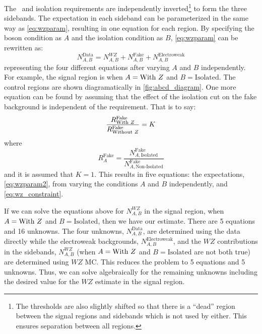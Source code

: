 The \z~and isolation requirements are 
independently inverted\footnote{The thresholds are also slightly shifted 
so that there is a ``dead'' region between the signal regions and sidebands 
which is not used by either. This ensures separation between all regions.}
to form the three sidebands.
The expectation in each sideband can be parameterized
in the same way as \eqn\eqref{eq:wzparam}, resulting in one
equation for each region. By specifying the \z boson condition
as $A$ and the isolation condition as $B$, \eqn\eqref{eq:wzparam}
can be rewritten as:
\begin{equation}
\label{eq:wzparam2}
N^{\textrm{Data}}_{A,B} =  N^{WZ}_{A,B} + N^{\textrm{Fake}}_{A,B} + N^{\textrm{Electroweak}}_{A,B}
\end{equation}
representing the four different equations after varying $A$ and $B$ independently.
For example, the signal region is when $A=\textrm{With \ensuremath{Z}}$ and
$B=\textrm{Isolated}$.
The control regions are shown diagramatically in \fig\ref{fig:abcd_diagram}.
One more equation can be found by assuming that the effect of 
the isolation cut on the fake background is independent of the \z
requirement.
That is to say:
\begin{equation}
\label{eq:wz_constraint}
\frac{R^{\textrm{Fake}}_{\textrm{With \ensuremath{Z}}}}{R^{\textrm{Fake}}_{\textrm{Without \ensuremath{Z}}}} = K
\end{equation}
where 
\begin{equation}
R^{\textrm{Fake}}_{A} = 
\frac{N^{\textrm{Fake}}_{A,\textrm{Isolated}}}
{N^{\textrm{Fake}}_{A,\textrm{Non-Isolated}}}
\end{equation}
and it is assumed that $K=1$.
This results in five equations: the expectations,
\eqn\eqref{eq:wzparam2}, from varying the conditions $A$ and $B$ independently,
and \eqn\eqref{eq:wz_constraint}.




If we can solve the equations above for $N^{WZ}_{A,B}$ in the signal region,
when $A=\textrm{With \ensuremath{Z}}$ and $B=\textrm{Isolated}$,
then we have our estimate. 
There are 5 equations and 16 unknowns. The four unknowns, $N^{\textrm{Data}}_{A,B}$,
are determined using the data directly while 
the electroweak backgrounds, $N^{\textrm{Electroweak}}_{A,B}$,
and the $WZ$ contributions in the sidebands, $N^{WZ}_{A,B}$ 
(when $A=\textrm{With \ensuremath{Z}}$ and $B=\textrm{Isolated}$ are not both true)
are determined using $WZ$ MC. This reduces the problem to 5 equations
and 5 unknowns. Thus, we can solve algebraically for the remaining unknowns
including the desired value for the $WZ$ estimate in the signal region.

